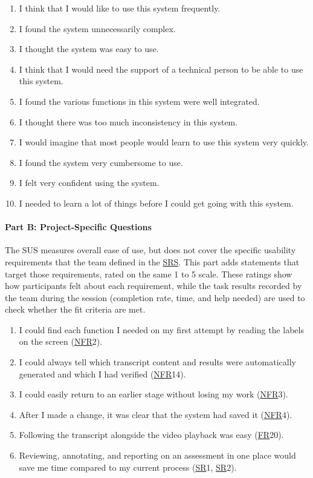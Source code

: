 \documentclass[12pt, titlepage]{article}
\newcommand{\SRSLink}{\href{https://github.com/Nour-Fawaz/MacaBoca/blob/main/pdfs/SRS/SRS.pdf}{SRS}}
\newcommand{\srsfr}[1]{\href{https://github.com/Nour-Fawaz/MacaBoca/blob/main/pdfs/SRS/SRS.pdf}{FR}}
\newcommand{\srsnfr}[1]{\href{https://github.com/Nour-Fawaz/MacaBoca/blob/main/pdfs/SRS/SRS.pdf}{NFR}}
\newcommand{\srssr}[1]{\href{https://github.com/Nour-Fawaz/MacaBoca/blob/main/pdfs/SRS/SRS.pdf}{SR}}
\renewcommand{\_}{\oldunderscore\allowbreak}
\begin{document}
\begin{enumerate}
  \item I think that I would like to use this system frequently.
  \item I found the system unnecessarily complex.
  \item I thought the system was easy to use.
  \item I think that I would need the support of a technical person to be able to use this system.
  \item I found the various functions in this system were well integrated.
  \item I thought there was too much inconsistency in this system.
  \item I would imagine that most people would learn to use this system very quickly.
  \item I found the system very cumbersome to use.
  \item I felt very confident using the system.
  \item I needed to learn a lot of things before I could get going with this system.
\end{enumerate}

\paragraph{Part B: Project-Specific Questions}
The SUS measures overall ease of use, but does not cover the specific usability requirements that the team defined in the \SRSLink{}.
This part adds statements that target those requirements, rated on the same 1 to 5 scale.
These ratings show how participants felt about each requirement, while the task results recorded by the team during the session (completion rate, time, and help needed) are used to check whether the fit criteria are met.

\begin{enumerate}[resume]
  \item I could find each function I needed on my first attempt by reading the labels on the screen (\srsnfr*{2}).
  \item I could always tell which transcript content and results were automatically generated and which I had verified (\srsnfr*{14}).
  \item I could easily return to an earlier stage without losing my work (\srsnfr*{3}).
  \item After I made a change, it was clear that the system had saved it (\srsnfr*{4}).
  \item Following the transcript alongside the video playback was easy (\srsfr*{20}).
  \item Reviewing, annotating, and reporting on an assessment in one place would save me time compared to my current process (\srssr*{1}, \srssr*{2}).
\end{enumerate}
\end{document}
